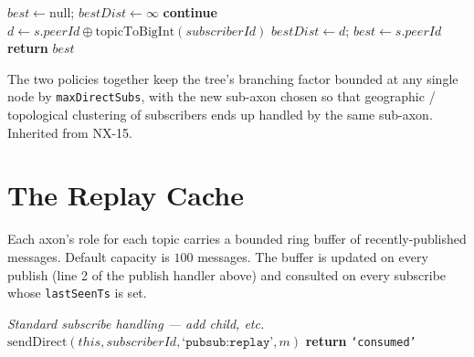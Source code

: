 \documentclass[twoside,nobib]{tufte-book}
\begin{document}
\begin{algorithm}
\caption{pickRelayPeer(role, subscriberId, forwarderId)}
\begin{algorithmic}[1]
\State $\mathit{best} \gets \mathrm{null}$;
       $\mathit{bestDist} \gets \infty$
    \textbf{continue}
  \EndIf
  \State $d \gets s.\mathit{peerId} \oplus
        \mathrm{topicToBigInt}(\mathit{subscriberId})$
    $\mathit{bestDist} \gets d$;
    $\mathit{best} \gets s.\mathit{peerId}$
  \EndIf
\EndFor
\State \textbf{return} $\mathit{best}$
\end{algorithmic}
\end{algorithm}

The two policies together keep the tree's branching factor
bounded at any single node by \texttt{maxDirectSubs}, with the
new sub-axon chosen so that geographic / topological clustering
of subscribers ends up handled by the same sub-axon. Inherited
from NX-15.

\section{The Replay Cache}

Each axon's role for each topic carries a bounded ring buffer of
recently-published messages. Default capacity is $100$ messages.
The buffer is updated on every publish (line 2 of the publish
handler above) and consulted on every subscribe whose
\texttt{lastSeenTs} is set.

\begin{algorithm}
\caption{subscribe handler with replay request}
\begin{algorithmic}[1]
\State \emph{Standard subscribe handling --- add child, etc.}
      \State $\mathrm{sendDirect}(\mathit{this},
             \mathit{subscriberId},
             \texttt{`pubsub:replay'},
             m)$
    \EndIf
  \EndFor
\EndIf
\State \textbf{return} \texttt{`consumed'}
\end{algorithmic}
\end{algorithm}
\end{document}
